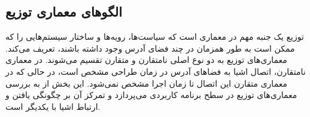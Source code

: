 \subsection{الگوهای معماری توزیع}
\begin{RTL}
توزیع یک جنبه مهم در معماری است که سیاست‌ها،
رویه‌ها و ساختار سیستم‌هایی را که ممکن است به طور همزمان در چند
فضای آدرس وجود داشته باشند، تعریف می‌کند. معماری‌های توزیع
به دو نوع اصلی نامتقارن و متقارن تقسیم می‌شوند.
در معماری نامتقارن، اتصال اشیا به فضاهای آدرس در زمان طراحی
مشخص است، در حالی که در معماری متقارن این اتصال تا زمان اجرا
مشخص نمی‌شود. این بخش از \cite{ref4} به بررسی معماری‌های توزیع در سطح برنامه
کاربردی می‌پردازد و تمرکز آن بر چگونگی یافتن و ارتباط اشیا با یکدیگر است.
\end{RTL}





